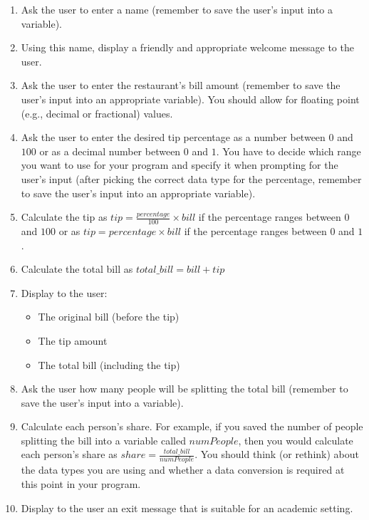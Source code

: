 \vspace*{-.1in}
\begin{enumerate}

\item Ask the user to enter a name (remember to save the user's input into a variable).

\item Using this name, display a friendly and appropriate welcome message to the user.

\item Ask the user to enter the restaurant's bill amount (remember to save the user's input into an appropriate
  variable). You should allow for floating point (e.g., decimal or fractional) values.

\item Ask the user to enter the desired tip percentage as a number between $0$ and $100$ or as a decimal number between
  $0$ and $1$. You have to decide which range you want to use for your program and specify it when prompting for the
  user's input (after picking the correct data type for the percentage, remember to save the user's input into an
  appropriate variable).

\item Calculate the tip as $tip = \frac{percentage}{100} \times bill$ if the percentage ranges between $0$ and $100$ or
  as $tip = percentage \times bill$ if the percentage ranges between $0$ and $1$.

\item Calculate the total bill as $total\_bill = bill+tip$

\item Display to the user:
    \begin{itemize}
        \item The original bill (before the tip)
        \item The tip amount
        \item The total bill (including the tip)
    \end{itemize}

\item Ask the user how many people will be splitting the total bill (remember to save the user's input into a variable).

\item Calculate each person's share. For example, if you saved the number of people splitting the bill into a variable
  called $numPeople$, then you would calculate each person's share as $share = \frac{total\_bill}{numPeople}$. You
  should think (or rethink) about the data types you are using and whether a data conversion is required at this point
  in your program.

\item Display to the user an exit message that is suitable for an academic setting.

\end{enumerate}

